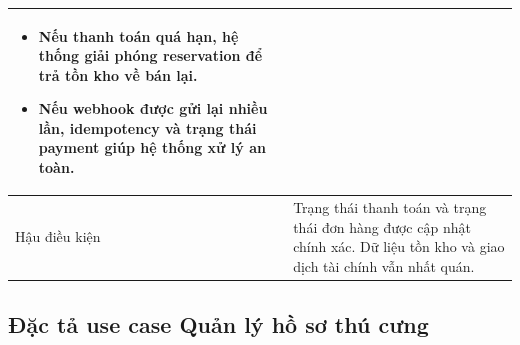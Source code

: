 \documentclass[../DoAn.tex]{subfiles}
\begin{document}
{\begin{longtable}{|p{3.2cm}|p{10.4cm}|}
\begin{minipage}[t]{10.1cm}
\begin{itemize}[leftmargin=*,topsep=0pt,itemsep=0pt]
    \item Nếu thanh toán quá hạn, hệ thống giải phóng reservation để trả tồn kho về bán lại.
    \item Nếu webhook được gửi lại nhiều lần, idempotency và trạng thái payment giúp hệ thống xử lý an toàn.
\end{itemize}
\end{minipage} \\ \hline
Hậu điều kiện & Trạng thái thanh toán và trạng thái đơn hàng được cập nhật chính xác. Dữ liệu tồn kho và giao dịch tài chính vẫn nhất quán. \\ \hline
\end{longtable}
}

\subsection{Đặc tả use case Quản lý hồ sơ thú cưng}
\label{subsection:2.3.5}
\end{document}
